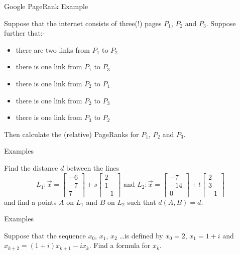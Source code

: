 \documentclass{beamer}
\begin{document}
\begin{frame}{Google PageRank Example}
\begin{example}
	Suppose that the internet consists of three(!) pages $P_1$, $P_2$ and $P_3$.
	Suppose further that:-
	\begin{itemize}
		\item there are two links from $P_1$ to $P_2$
		\item there is one link from $P_1$ to $P_3$
		\item there is one link from $P_2$ to $P_1$
		\item there is one link from $P_2$ to $P_3$
		\item there is one link from $P_3$ to $P_2$
	\end{itemize}
	Then calculate the (relative) PageRanks for $P_1$, $P_2$ and $P_3$.
\end{example}
\end{frame}

\begin{frame}{Examples}
\begin{example}
Find the distance $d$ between the lines
\begin{equation*}
L_1: \vec{x} = \left[
\begin{matrix}
-6\\
-7\\
7
\end{matrix}
\right]+s
\left[
\begin{matrix}
2\\
1\\
-1
\end{matrix}
\right]\text{ and } L_2: \vec{x} =
\left[
\begin{matrix}
-7\\
-14\\
0
\end{matrix}
\right]+ t \left[
\begin{matrix}
2\\
3\\
-1
\end{matrix}
\right]
\end{equation*}
and find a points $A$ on $L_1$ and $B$ on $L_2$ such that $d(A, B) = d$.
\end{example}
\end{frame}

\begin{frame}{Examples}
\begin{example}
	Suppose that the sequence $x_0$, $x_1$, $x_2$ \dots is defined by $x_0 = 2$, $x_1 = 1+i$ and $x_{k+2} = (1+i)x_{k+1}-ix_k$. Find a formula for $x_k$.
\end{example}
\end{frame}
\end{document}
